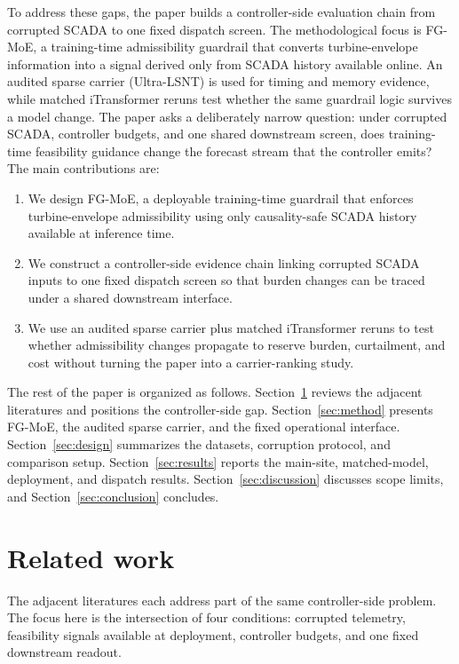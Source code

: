 \documentclass[review,1p,times]{elsarticle}
\begin{document}
To address these gaps, the paper builds a controller-side evaluation chain from corrupted SCADA to one fixed dispatch screen. The methodological focus is FG-MoE, a training-time admissibility guardrail that converts turbine-envelope information into a signal derived only from SCADA history available online. An audited sparse carrier (Ultra-LSNT) is used for timing and memory evidence, while matched iTransformer reruns test whether the same guardrail logic survives a model change. The paper asks a deliberately narrow question: under corrupted SCADA, controller budgets, and one shared downstream screen, does training-time feasibility guidance change the forecast stream that the controller emits? The main contributions are:
\begin{enumerate}
\item We design FG-MoE, a deployable training-time guardrail that enforces turbine-envelope admissibility using only causality-safe SCADA history available at inference time.
\item We construct a controller-side evidence chain linking corrupted SCADA inputs to one fixed dispatch screen so that burden changes can be traced under a shared downstream interface.
\item We use an audited sparse carrier plus matched iTransformer reruns to test whether admissibility changes propagate to reserve burden, curtailment, and cost without turning the paper into a carrier-ranking study.
\end{enumerate}
The rest of the paper is organized as follows. Section~\ref{sec:related} reviews the adjacent literatures and positions the controller-side gap. Section~\ref{sec:method} presents FG-MoE, the audited sparse carrier, and the fixed operational interface. Section~\ref{sec:design} summarizes the datasets, corruption protocol, and comparison setup. Section~\ref{sec:results} reports the main-site, matched-model, deployment, and dispatch results. Section~\ref{sec:discussion} discusses scope limits, and Section~\ref{sec:conclusion} concludes.

\section{Related work}
\label{sec:related}

The adjacent literatures each address part of the same controller-side problem. The focus here is the intersection of four conditions: corrupted telemetry, feasibility signals available at deployment, controller budgets, and one fixed downstream readout.
\end{document}
